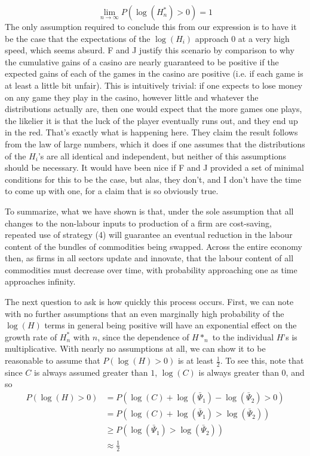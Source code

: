 \documentclass{article}
\theoremstyle{definition}
\theoremstyle{plain}
\theoremstyle{theorem}
\begin{document}
\[ \lim_{n \to \infty}P(\log(H^*_n) > 0) = 1 \]
The only assumption required to conclude this from our expression is to have it be the case that the expectations of the $\log(H_i)$ approach $0$ at a very high speed, which seems absurd. F and J justify this scenario by comparison to why the cumulative gains of a casino are nearly guaranteed to be positive if the expected gains of each of the games in the casino are positive (i.e. if each game is at least a little bit unfair). This is intuitively trivial: if one expects to lose money on any game they play in the casino, however little and whatever the distributions actually are, then one would expect that the more games one plays, the likelier it is that the luck of the player eventually runs out, and they end up in the red. That's exactly what is happening here. They claim the result follows from the law of large numbers, which it does if one assumes that the distributions of the $H_i$'s are all identical and independent, but neither of this assumptions should be necessary. It would have been nice if F and J provided a set of minimal conditions for this to be the case, but alas, they don't, and I don't have the time to come up with one, for a claim that is so obviously true. \par 
To summarize, what we have shown is that, under the sole assumption that all changes to the non-labour inputs to production of a firm are cost-saving, repeated use of strategy (4) will guarantee an eventual reduction in the labour content of the bundles of commodities being swapped. Across the entire economy then, as firms in all sectors update and innovate, that the labour content of all commodities must decrease over time, with probability approaching one as time approaches infinity. \par 
The next question to ask is how quickly this process occurs. First, we can note with no further assumptions that an even marginally high probability of the $\log(H)$ terms in general being positive will have an exponential effect on the growth rate of $H^*_n$ with $n$, since the dependence of $H*_n$ to the individual $H$'s is multiplicative. With nearly no assumptions at all, we can show it to be reasonable to assume that $P(\log(H) > 0)$ is at least $\frac{1}{2}$. To see this, note that since $C$ is always assumed greater than $1$, $\log(C)$ is always greater than $0$, and so
\begin{align}
	P(\log(H) > 0) &= P(\log(C)+\log(\bar{\Psi}_1) - \log(\bar{\Psi}_2) > 0) \\
				   &= P(\log(C) + \log(\bar{\Psi}_1) > \log(\bar{\Psi}_2)) \\
				   &\geq P(\log(\bar{\Psi}_1) > \log(\bar{\Psi}_2)) \\
				   &\approx \frac{1}{2}
\end{align} 
\end{document}
